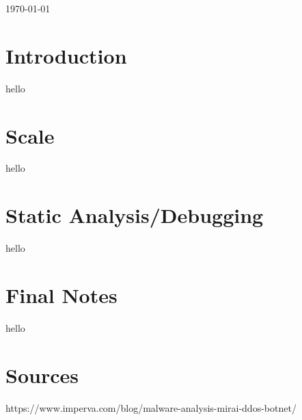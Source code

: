 \documentclass[12pt, letterpaper]{article}
\begin{document}
{\large \today}\\ %
\newpage

\begin{sloppypar}



\section*{Introduction}
\begin{flushleft}
hello


\end{flushleft}

\section*{Scale}
\begin{flushleft}
hello


\end{flushleft}



\section*{Static Analysis/Debugging}
\begin{flushleft}
hello


\end{flushleft}


\section*{Final Notes}
\begin{flushleft}
hello


\end{flushleft}


\section*{Sources}
\begin{flushleft}
https://www.imperva.com/blog/malware-analysis-mirai-ddos-botnet/


\end{flushleft}



\end{sloppypar}
\end{document}
